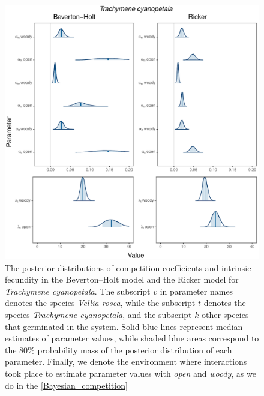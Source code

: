 \begin{refsection}
\begin{figure}[H]
  \centerline{\includegraphics[width=1\textwidth]{figures/appendixB_fig2}}
  \caption[The posterior distributions of competition coefficients and intrinsic fecundity in the Beverton--Holt model and the Ricker model for \textit{Trachymene cyanopetala}]{  The posterior distributions of competition coefficients and intrinsic fecundity in the Beverton--Holt model and the Ricker model for \textit{Trachymene cyanopetala}. The subscript $v$ in parameter names denotes the species \textit{Vellia rosea}, while the subscript $t$ denotes the species \textit{Trachymene cyanopetala}, and the subscript $k$ other species that germinated in the system. Solid blue lines represent median estimates of parameter values, while shaded blue areas correspond to the 80\% probability mass of the posterior distribution of each parameter.  Finally, we denote the environment where interactions took place to estimate parameter values with \textit{open} and \textit{woody}, as we do in the \autoref{Bayesian_competition} }
  \label{fig:trcy_dist}
\end{figure}


\printbibliography
\end{refsection}
